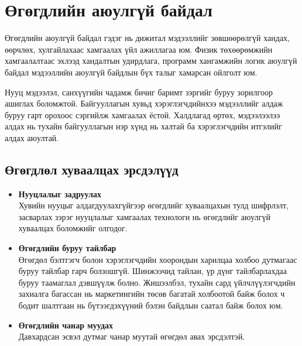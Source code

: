 \section{Өгөгдлийн аюулгүй байдал}
Өгөгдлийн аюулгүй байдал гэдэг нь дижитал мэдээллийг зөвшөөрөлгүй хандах, өөрчлөх, хулгайлахаас хамгаалах үйл ажиллагаа юм. Физик төхөөрөмжийн хамгаалалтаас эхлээд хандалтын удирдлага, программ хангамжийн логик аюулгүй байдал мэдээллийн аюулгүй байдлын бүх талыг хамарсан ойлголт юм. \cite{IBMSecureData}

Нууц мэдээлэл, санхүүгийн чадамж бичиг баримт зэргийг буруу зорилгоор ашиглах боломжтой.
Байгууллагын хувьд хэрэглэгчдийнхээ мэдээллийг алдаж буруу гарт орохоос сэргийлж хамгаалах ёстой. Халдлагад өртөх, мэдээлээлээ алдах нь тухайн байгууллагын нэр хүнд нь халтай ба хэрэглэгчдийн итгэлийг алдах аюултай.

\subsection*{Өгөгдлөл хуваалцах эрсдэлүүд}

\begin{itemize}
    \item \textbf{Нууцлалыг задруулах}\\
    Хувийн нууцыг алдагдуулахгүйгээр өгөгдлийг хуваалцахын тулд шифрлэлт, засварлах зэрэг нууцлалыг хамгаалах технологи нь өгөгдлийг аюулгүй хуваалцах боломжийг олгодог.
    \item \textbf{Өгөгдлийн буруу тайлбар}\\
    Өгөгдөл бэлтгэгч болон хэрэглэгчдийн хоорондын харилцаа холбоо дутмагаас буруу тайлбар гарч болзошгүй. Шинжээчид тайлан, үр дүнг тайлбарлахдаа буруу таамаглал дэвшүүлж болно. Жишээлбэл, тухайн сард үйлчлүүлэгчдийн захиалга багассан нь маркетингийн төсөв багатай холбоотой байж болох ч бодит шалтгаан нь бүтээгдэхүүний бэлэн байдлын саатал байж болох юм.
    \item \textbf{Өгөгдлийн чанар муудах}\\
    Давхардсан эсвэл дутмаг чанар муутай өгөгдөл авах эрсдэлтэй.
\end{itemize}

